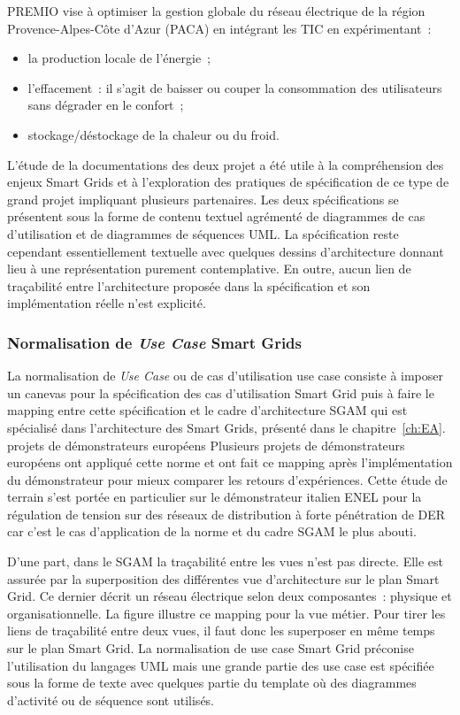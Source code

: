 PREMIO vise à optimiser la gestion globale du réseau électrique de la région 
Provence-Alpes-Côte d'Azur (PACA) en intégrant les TIC en expérimentant~:
\begin{itemize}
\item la production locale de l'énergie~;
\item l'effacement~: il s'agit de baisser ou couper la consommation des 
utilisateurs sans dégrader en le confort~;
\item stockage/déstockage de la chaleur ou du froid.
\end{itemize}

L'étude de la documentations des deux projet a été utile à la compréhension des 
enjeux Smart Grids et à l'exploration des pratiques de spécification de ce type 
de grand projet impliquant plusieurs partenaires. Les deux spécifications se 
présentent sous la forme de contenu textuel agrémenté de diagrammes de cas 
d'utilisation et de diagrammes de séquences UML. La spécification reste 
cependant essentiellement textuelle avec quelques dessins d'architecture donnant 
lieu à une représentation purement contemplative. En outre, aucun lien de 
traçabilité entre l'architecture proposée dans la spécification et son 
implémentation réelle n'est explicité.
 
\subsubsection{Normalisation de \textit{Use Case} Smart Grids}

La normalisation de \textit{Use Case} ou de cas d'utilisation use case consiste 
à imposer un canevas pour la spécification des cas d'utilisation Smart Grid puis 
à faire le mapping entre cette spécification et le cadre d'architecture SGAM qui 
est spécialisé dans l'architecture des Smart Grids, présenté dans le 
chapitre~\ref{ch:EA}.  projets de démonstrateurs européens 
Plusieurs projets de démonstrateurs européens ont appliqué cette norme et ont 
fait ce mapping après l'implémentation du démonstrateur pour mieux comparer les 
retours d'expériences. Cette étude de terrain s'est portée en particulier sur le 
démonstrateur italien ENEL pour la régulation de tension sur des réseaux de 
distribution à forte pénétration de DER car c'est le cas d'application de la 
norme et du cadre SGAM le plus abouti. 

D'une part, dans le SGAM la traçabilité entre les vues n'est pas directe. Elle 
est assurée par la superposition des différentes vue d'architecture sur le plan 
Smart Grid. Ce dernier décrit un réseau électrique selon deux composantes~: 
physique et organisationnelle. La figure illustre ce mapping pour la vue métier. 
Pour tirer les liens de traçabilité entre deux vues, il faut donc les superposer 
en même temps sur le plan Smart Grid. La normalisation de use case Smart Grid 
préconise l'utilisation du langages UML mais une grande partie des use case est 
spécifiée sous la forme de texte avec quelques partie du template où des 
diagrammes d'activité ou de séquence sont utilisés. 

